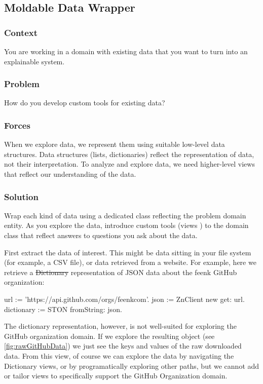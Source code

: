 \documentclass[sigconf]{acmart}
\renewcommand{\nbc}[3]{} %
\newcommand\eog[1]{\nbc{Edward}{#1}{purple}}
\begin{document}
\subsection*{Moldable Data Wrapper}\label{pat:moldableDataWrapper}

\subsubsection*{Context}
You are working in a domain with existing data that you want to turn into an explainable system.

\subsubsection*{Problem}
How do you develop custom tools for existing data?

\subsubsection*{Forces}
When we explore data, we represent them using suitable low-level data structures.
Data structures (lists, dictionaries) reflect the representation of data, not their interpretation.
To analyze and explore data, we need higher-level views that reflect our understanding of the data.

\subsubsection*{Solution}
Wrap each kind of data using a dedicated class reflecting the problem domain entity.
As you explore the data, introduce custom tools (views \etc) to the domain class that reflect answers to questions you ask about the data.

First extract the data of interest.
This might be data sitting in your file system (for example, a CSV file), or data retrieved from a website.
For example, here we retrieve a \st{Dictionary} representation of JSON data about the feenk GitHub organization:

\begin{code}
url := 'https://api.github.com/orgs/feenkcom'.
json := ZnClient new get: url.
dictionary := STON fromString: json.
\end{code}

\eog{Would love to see the goal or motivation earlier for this kind of jazz.}

The dictionary representation, however, is not well-suited for exploring the GitHub organization domain.
If we explore the resulting object (see \autoref{fig:rawGitHubData}) we just see the keys and values of the raw downloaded data.
From this view, of course we can explore the data by navigating the Dictionary views, or by programatically exploring other paths, but we cannot add or tailor views to specifically support the GitHub Organization domain.
\end{document}
